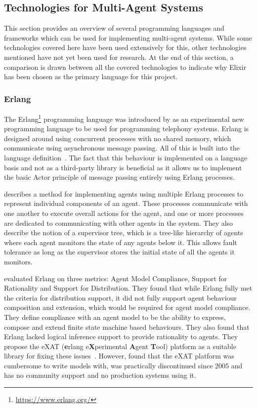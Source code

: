 \subsection{Technologies for Multi-Agent Systems}

This section provides an overview of several programming languages and frameworks which can be used for implementing multi-agent systems.
While some technologies covered here have been used extensively for this, other technologies mentioned have not yet been used for research.
At the end of this section, a comparison is drawn between all the covered technologies to indicate why Elixir has been chosen as the primary language for this project.

\subsubsection{Erlang}

The Erlang\footnote{\url{https://www.erlang.org/}} programming language was introduced by  as an experimental new programming language to be used for programming telephony systems.
Erlang is designed around using concurrent processes with no shared memory, which communicate using asynchronous message passing.
All of this is built into the language definition~\cite{armstrong2007history}.
The fact that this behaviour is implemented on a language basis and not as a third-party library is beneficial as it allows us to implement the basic Actor principle of message passing entirely using Erlang processes.

 describes a method for implementing agents using multiple Erlang processes to represent individual components of an agent.
These processes communicate with one another to execute overall actions for the agent, and one or more processes are dedicated to communicating with other agents in the system.
They also describe the notion of a supervisor tree, which is a tree-like hierarchy of agents where each agent monitors the state of any agents below it.
This allows fault tolerance as long as the supervisor stores the initial state of all the agents it monitors.

 evaluated Erlang on three metrics: Agent Model Compliance, Support for Rationality and Support for Distribution.
They found that while Erlang fully met the criteria for distribution support, it did not fully support agent behaviour composition and extension, which would be required for agent model compliance.
They define compliance with an agent model to be the ability to express, compose and extend finite state machine based behaviours.
They also found that Erlang lacked logical inference support to provide rationality to agents.
They propose the eXAT (\textbf{e}rlang e\textbf{X}perimental \textbf{A}gent \textbf{T}ool) platform as a suitable library for fixing these issues~\cite{distefano2003exat}.
However,  found that the eXAT platform was cumbersome to write models with, was practically discontinued since 2005 and has no community support and no production systems using it.

